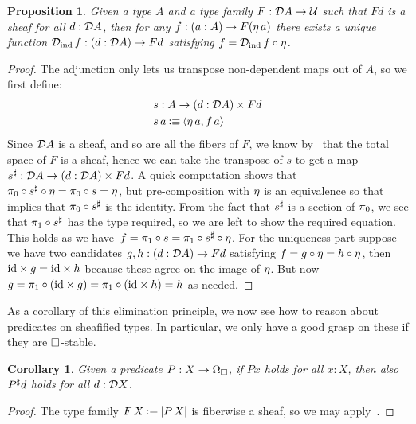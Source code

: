 \documentclass[11pt]{article}
\newtheorem{prop}[thrm]{Proposition}
\newtheorem{coro}[thrm]{Corollary}
\begin{document}
\begin{prop}\label{prop:sheafification-elim-principle}
Given a type \(A\) and a type family \(F : \mathcal{D}{A} \to \mathcal{U}\) such that
\(Fd\) is a sheaf for all \(d : \mathcal{D}{A}\), then for any
\(f : (a : A) \to F(\eta\,{a})\) there exists a unique function
\(\mathcal{D}_\text{ind}\,{f} : (d : \mathcal{D}{A}) \to Fd\) satisfying
\(f = \mathcal{D}_\text{ind}\,{f} \circ \eta\).
\end{prop}
\begin{proof}
  The adjunction only lets us transpose non-dependent maps out of \(A\),
  so we first define:
  \begin{align*}
    &s : A \to {(d : \mathcal{D}{A})}\times{Fd}\\
    &s\,a \mathbin{\vcentcolon\equiv} \langle{\eta\,{a}},{f\,a}\rangle
  \end{align*}
  Since \(\mathcal{D}{A}\) is a sheaf, and so are all the fibers of \(F\), we know
  by~ that the total space of \(F\) is a sheaf,
  hence we can take the transpose of \(s\) to get a map
  \({s}^\sharp : \mathcal{D}{A} \to {(d : \mathcal{D}{A})}\times{Fd}\).
  A quick computation shows that
  \(\pi_0 \circ {s}^\sharp \circ \eta = \pi_0 \circ s = \eta\),
  but pre-composition with \(\eta\) is an equivalence so that
  implies that \(\pi_0 \circ {s}^\sharp\) is the identity.
  From the fact that \({s}^\sharp\) is a section of \(\pi_0\), we see that
  \(\pi_1 \circ {s}^\sharp\) has the type required, so we are left to
  show the required equation.
  This holds as we have~\(f = \pi_1 \circ s = \pi_1 \circ {s}^\sharp \circ \eta\).
  For the uniqueness part suppose we have two candidates
  \(g,h : (d : \mathcal{D}{A}) \to Fd\) satisfying
  \(f = g\circ\eta = h\circ\eta\), then
  \({\text{id}}\times{g} = {\text{id}}\times{h}\) because these agree on
  the image of \(\eta\).
  But now
  \(g = \pi_1 \circ ({\text{id}}\times{g}) = \pi_1 \circ ({\text{id}}\times{h}) = h\) as needed.
\end{proof}

As a corollary of this elimination principle, we now see how to reason
about predicates on sheafified types.
%
In particular, we only have a good grasp on these if they are
\(\Box\)-stable.

\begin{coro}\label{prop:stable-predicate-induction}
  Given a predicate \(P : X \to \Omega_\Box\), if \(P x\) holds for all \(x : X\),
  then also \({P}^\sharp d\) holds for all \(d : \mathcal{D}{X}\).
\end{coro}
\begin{proof}
  The type family
  \(F\,X \mathbin{\vcentcolon\equiv} |{P\,X}|\) is fiberwise a sheaf, so we may
  apply~.
\end{proof}
\end{document}
